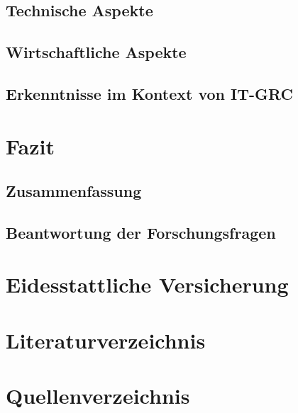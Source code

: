 \documentclass[10pt]{article}
\begin{document}
\subsection{Technische Aspekte}
\subsection{Wirtschaftliche Aspekte}
\subsection{Erkenntnisse im Kontext von IT-GRC}
\section{Fazit}
\subsection{Zusammenfassung}
\subsection{Beantwortung der Forschungsfragen}
\section{Eidesstattliche Versicherung}
\newpage
\section{Literaturverzeichnis}
\printbibliography
\newpage
\section{Quellenverzeichnis}
\newpage
\listoffigures
\end{document}
